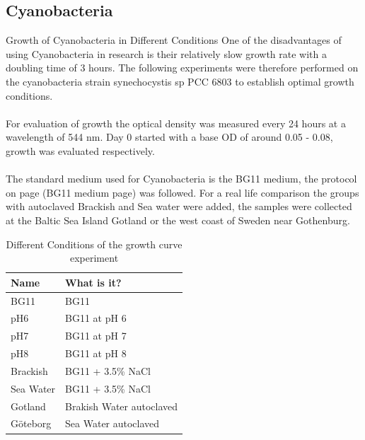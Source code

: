 \subsection{Cyanobacteria}
Growth of Cyanobacteria in Different Conditions
One of the disadvantages of using Cyanobacteria in research is their relatively slow growth rate with a doubling time of 3 hours. The following experiments were therefore performed on the cyanobacteria strain synechocystis sp PCC 6803 to establish optimal growth conditions. \\ \\
For evaluation of growth the optical density was measured every 24 hours at a wavelength of 544 nm. Day 0 started with a base OD of around 0.05 - 0.08, growth was evaluated respectively. \\ \\
The standard medium used for Cyanobacteria is the BG11 medium, the protocol on page (BG11 medium page) was followed. For a real life comparison the groups with autoclaved Brackish and Sea water were added, the samples were collected at the Baltic Sea Island Gotland or the west coast of Sweden near Gothenburg. 

\begin{table}[!htpb]
\centering
\caption{Different Conditions of the growth curve experiment}
\begin{tabular}{|l|l|} 
\hline
\textbf{Name} & \textbf{What is it?}       \\ 
\hline
BG11          & BG11                      \\
pH6           & BG11 at pH 6              \\
pH7           & BG11 at pH 7              \\
pH8           & BG11 at pH 8              \\
Brackish      & BG11 + 3.5\% NaCl         \\
Sea Water     & BG11 + 3.5\% NaCl         \\
Gotland       & Brakish Water autoclaved  \\
Göteborg      & Sea Water autoclaved      \\
\hline
\end{tabular}
\end{table}
\FloatBarrier

